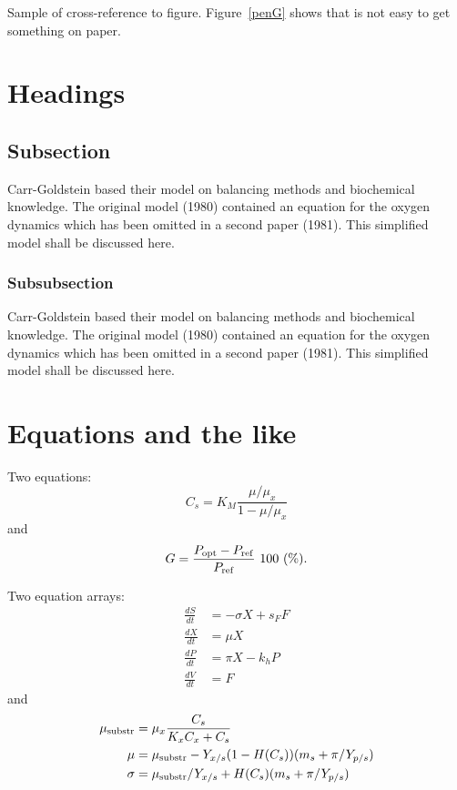 \documentclass[cis]{ipart}
\theoremstyle{plain}
\begin{document}
Sample of cross-reference to figure.
Figure~\ref{penG} shows that is not easy to get something on paper.


\section{Headings}

\subsection{Subsection}
Carr-Goldstein based their model on balancing methods and
biochemical know\-ledge. The original model (1980) contained an equation for the
oxygen dynamics which has been omitted in a second paper
(1981). This simplified model shall be discussed here.

\subsubsection{Subsubsection}
Carr-Goldstein
based their model on balancing methods and
biochemical know\-ledge. The original model (1980) contained an equation for the
oxygen dynamics which has been omitted in a second paper
(1981). This simplified model shall be discussed here.

\section{Equations and the like}

Two equations:
\begin{equation}
    C_{s}  =  K_{M} \frac{\mu/\mu_{x}}{1-\mu/\mu_{x}} \label{ccs}
\end{equation}
and
\begin{equation}
    G = \frac{P_{\rm opt} - P_{\rm ref}}{P_{\rm ref}} \mbox{\ }100 \mbox{\ }(\%).
\end{equation}

Two equation arrays:
\begin{align}
  \frac{dS}{dt} & =  - \sigma X + s_{F} F\\
  \frac{dX}{dt} & =    \mu    X\\
  \frac{dP}{dt} & =    \pi    X - k_{h} P\\
  \frac{dV}{dt} & =    F
\end{align}
and
\begin{align}
 \mu_{\rm substr} & =  \mu_{x} \frac{C_{s}}{K_{x}C_{x}+C_{s}}  \\
 \mu              & =  \mu_{\rm substr} - Y_{x/s}(1-H(C_{s}))(m_{s}+\pi /Y_{p/s}) \\
 \sigma           & =  \mu_{\rm substr}/Y_{x/s}+ H(C_{s}) (m_{s}+ \pi /Y_{p/s})
\end{align}
\end{document}
